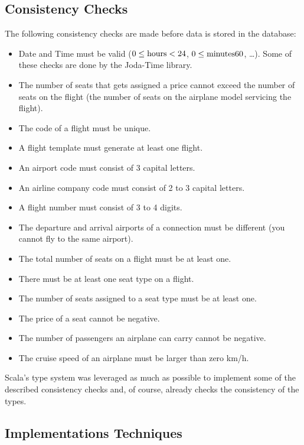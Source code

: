 \documentclass[a4paper]{article}
\begin{document}
\subsection{Consistency Checks}
\label{sec:consistency-checks}
The following consistency checks are made before data is stored in the database:

\begin{itemize}
 \item Date and Time must be valid ($0 \leq \textnormal{hours} < 24$, $0 \leq \textnormal{minutes} 60$, \ldots). Some of these checks are done by the Joda-Time library.
 \item The number of seats that gets assigned a price cannot exceed the number of seats on the flight (the number of seats on the airplane model servicing the flight).
 \item The code of a flight must be unique.
 \item A flight template must generate at least one flight.
 \item An airport code must consist of 3 capital letters.
 \item An airline company code must consist of 2 to 3 capital letters.
 \item A flight number must consist of 3 to 4 digits.
 \item The departure and arrival airports of a connection must be different (you cannot fly to the same airport).
 \item The total number of seats on a flight must be at least one.
 \item There must be at least one seat type on a flight.
 \item The number of seats assigned to a seat type must be at least one.
 \item The price of a seat cannot be negative.
 \item The number of passengers an airplane can carry cannot be negative.
 \item The cruise speed of an airplane must be larger than zero km/h.
\end{itemize}

Scala's type system was leveraged as much as possible to implement some of the described consistency checks and, of course, already checks the consistency of the types.

\subsection{Implementations Techniques}
\label{sec:implementation-techniques}
\end{document}

